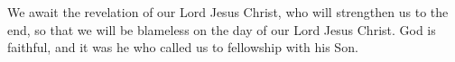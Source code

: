 
\lettrine{W}{}e await the revelation of our Lord Jesus Christ, who will strengthen us to the end, so that we will be blameless on the day of our Lord Jesus Christ. God is faithful, and it was he who called us to fellowship with his Son.